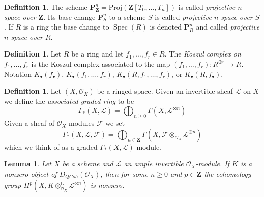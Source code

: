 \documentclass{amsart}
\theoremstyle{plain}
\newtheorem{lemma}[subsection]{Lemma}
\theoremstyle{definition}
\newtheorem{definition}[subsection]{Definition}
\theoremstyle{remark}
\numberwithin{equation}{subsection}
\def\Spec{\mathop{\mathrm{Spec}}}
\def\QCoh{\mathit{QCoh}}
\begin{document}
\begin{definition}
\label{constructions-definition-projective-space}
The scheme
$\mathbf{P}^n_{\mathbf{Z}} = \text{Proj}(\mathbf{Z}[T_0, \ldots, T_n])$
is called {\it projective $n$-space over $\mathbf{Z}$}.
Its base change $\mathbf{P}^n_S$ to a scheme $S$ is called
{\it projective $n$-space over $S$}. If $R$ is a ring the base change
to $\Spec(R)$ is denoted $\mathbf{P}^n_R$ and called
{\it projective $n$-space over $R$}.
\end{definition}

\begin{definition}
\label{more-algebra-definition-koszul-complex}
Let $R$ be a ring and let $f_1, \ldots, f_r \in R$. The
{\it Koszul complex on $f_1, \ldots, f_r$} is the Koszul complex
associated to the map $(f_1, \ldots, f_r) : R^{\oplus r} \to R$.
Notation $K_\bullet(f_\bullet)$, $K_\bullet(f_1, \ldots, f_r)$,
$K_\bullet(R, f_1, \ldots, f_r)$, or $K_\bullet(R, f_\bullet)$.
\end{definition}

\begin{definition}
\label{modules-definition-gamma-star}
Let $(X, \mathcal{O}_X)$ be a ringed space.
Given an invertible sheaf $\mathcal{L}$ on $X$ we define
the {\it associated graded ring} to be
$$
\Gamma_*(X, \mathcal{L})
=
\bigoplus\nolimits_{n \geq 0} \Gamma(X, \mathcal{L}^{\otimes n})
$$
Given a sheaf of $\mathcal{O}_X$-modules $\mathcal{F}$ we set
$$
\Gamma_*(X, \mathcal{L}, \mathcal{F})
=
\bigoplus\nolimits_{n \in \mathbf{Z}} \Gamma(X,
\mathcal{F} \otimes_{\mathcal{O}_X} \mathcal{L}^{\otimes n})
$$
which we think of as a graded $\Gamma_*(X, \mathcal{L})$-module.
\end{definition}

\begin{lemma}
\label{lemma-nonzero-some-cohomology}
Let $X$ be a scheme and $\mathcal{L}$ an ample invertible
$\mathcal{O}_X$-module. If $K$ is a nonzero object of
$D_\QCoh(\mathcal{O}_X)$, then for some $n \geq 0$ and $p \in \mathbf{Z}$
the cohomology group
$H^p(X, K \otimes_{\mathcal{O}_X}^\mathbf{L} \mathcal{L}^{\otimes n})$
is nonzero.
\end{lemma}
\end{document}
